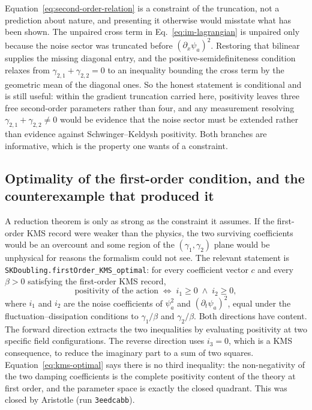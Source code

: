 \documentclass[aps,prd,reprint,nofootinbib,superscriptaddress]{revtex4-2}
\begin{document}
Equation~\eqref{eq:second-order-relation} is a constraint of the
truncation, not a prediction about nature, and presenting it otherwise
would misstate what has been shown. The unpaired cross term in
Eq.~\eqref{eq:im-lagrangian} is unpaired only because the noise sector
was truncated before $(\partial_x \psi_a)^2$. Restoring that bilinear
supplies the missing diagonal entry, and the positive-semidefiniteness
condition relaxes from $\gamma_{2,1}+\gamma_{2,2} = 0$ to an inequality
bounding the cross term by the geometric mean of the diagonal ones. So
the honest statement is conditional and is still useful: within the
gradient truncation carried here, positivity leaves three free
second-order parameters rather than four, and any measurement resolving
$\gamma_{2,1}+\gamma_{2,2} \neq 0$ would be evidence that the noise
sector must be extended rather than evidence against
Schwinger--Keldysh positivity. Both branches are informative, which is
the property one wants of a constraint.

\subsection{Optimality of the first-order condition, and the
counterexample that produced it}
\label{sec:higher-optimal}

A reduction theorem is only as strong as the constraint it assumes. If
the first-order KMS record were weaker than the physics, the two
surviving coefficients would be an overcount and some region of the
$(\gamma_1,\gamma_2)$ plane would be unphysical for reasons the
formalism could not see. The relevant statement is
\texttt{SKDoubling.firstOrder\_KMS\_optimal}: for every coefficient
vector $c$ and every $\beta > 0$ satisfying the first-order KMS record,
\begin{equation}
\text{positivity of the action}
  \;\Longleftrightarrow\;
  i_1 \geq 0 \;\wedge\; i_2 \geq 0 ,
\label{eq:kms-optimal}
\end{equation}
where $i_1$ and $i_2$ are the noise coefficients of $\psi_a^2$ and
$(\partial_t \psi_a)^2$, equal under the fluctuation--dissipation
conditions to $\gamma_1/\beta$ and $\gamma_2/\beta$. Both directions
have content. The forward direction extracts the two inequalities by
evaluating positivity at two specific field configurations. The reverse
direction uses $i_3 = 0$, which is a KMS consequence, to reduce the
imaginary part to a sum of two squares. Equation~\eqref{eq:kms-optimal}
says there is no third inequality: the non-negativity of the two damping
coefficients is the complete positivity content of the theory at first
order, and the parameter space is exactly the closed quadrant. This was
closed by Aristotle (run \texttt{3eedcabb}).
\end{document}
